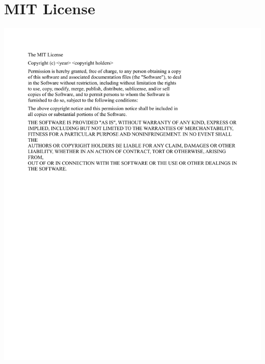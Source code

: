 \newpage
\chapter{MIT License}
\label{app:license}
\hspace*{-2cm}\includegraphics[width =\paperwidth]{appendices/mit-license.pdf}
